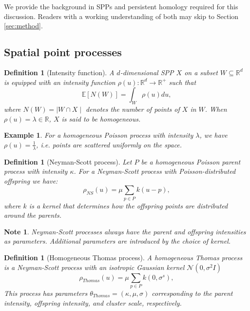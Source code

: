 \documentclass[11pt,letterpaper]{article}
\newcommand{\R}{\mathbb{R}}
\newcommand{\E}{\mathbb{E}}
\newcommand{\1}{\mathds{1}}
\newcommand{\kpar}{\kappa}
\newcommand{\mo}{\mu}
\theoremstyle{plain}
\theoremstyle{definitioncolon}
\newtheorem{definition}[theorem]{Definition}
\newtheorem*{note}{Note}
\newtheorem*{example}{Example}
\begin{document}
We provide the background in SPPs and persistent homology required for this
discussion. Readers with a working understanding of both may skip to
Section \ref{sec:method}.

\subsection{Spatial point processes}
\label{ssec:spp}

    \begin{definition}[Intensity function]
        A $d$-dimensional SPP $X$ on a subset $W \subseteq \R^d$ is equipped
        with an intensity function $\rho(u): \R^d \rightarrow \R^+$ such that
            \[
            \E[N(W)] = \int_W \rho(u) du,
            \]
        where $N(W) = \mid W \cap X \mid$ denotes the number of points of $X$
        in $W$. When $\rho(u) = \lambda \in \R$, $X$ is said to be
        \emph{homogeneous}.
    \end{definition}

    \begin{example}
        For a homogeneous Poisson process with intensity $\lambda$, we have
        $\rho(u) = \frac{1}{\lambda}$, i.e. points are scattered uniformly on
        the space.
    \end{example}

    \begin{definition}[Neyman-Scott process]
        Let $P$ be a homogeneous Poisson \emph{parent} process with intensity
        $\kpar$. For a Neyman-Scott process with Poisson-distributed offspring
        we have:
            \[
            \rho_{NS}(u) = \mo \sum_{p \in P} k(u - p),
            \]
        where $k$ is a kernel that determines how the \emph{offspring} points
        are distributed around the parents.
    \end{definition}

    \begin{note}
        Neyman-Scott processes always have the parent and offspring intensities
        as parameters. Additional parameters are introduced by the choice of
        kernel.
    \end{note}

    \begin{definition}[Homogeneous Thomas process]
        A homogeneous Thomas process is a Neyman-Scott process with an isotropic
        Gaussian kernel $\mathcal{N}(0, \sigma^2I)$
            \[
            \rho_{Thomas}(u) = \mo \sum_{p \in P} k(0, \sigma^s),
            \]
        This process has parameters $\theta_{Thomas} = (\kappa, \mu, \sigma)$
        corresponding to the parent intensity, offspring intensity, and cluster
        scale, respectively.
    \end{definition}
\end{document}

